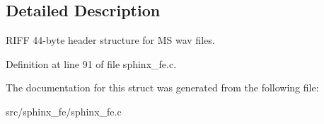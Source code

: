 \subsection{Detailed Description}
R\+I\+F\+F 44-\/byte header structure for M\+S wav files. 



Definition at line 91 of file sphinx\+\_\+fe.\+c.



The documentation for this struct was generated from the following file\+:\begin{DoxyCompactItemize}
\item 
src/sphinx\+\_\+fe/sphinx\+\_\+fe.\+c\end{DoxyCompactItemize}

